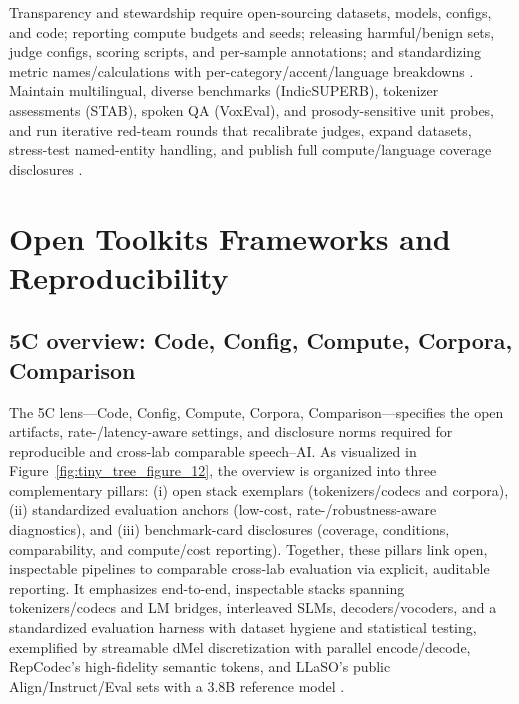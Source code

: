 \documentclass{article}
\begin{document}
Transparency and stewardship require open-sourcing datasets, models, configs, and code; reporting compute budgets and seeds; releasing harmful/benign sets, judge configs, scoring scripts, and per-sample annotations; and standardizing metric names/calculations with per-category/accent/language breakdowns \cite{peri2024speechguardexploringadversarialrobustnes}. Maintain multilingual, diverse benchmarks (IndicSUPERB), tokenizer assessments (STAB), spoken QA (VoxEval), and prosody-sensitive unit probes, and run iterative red-team rounds that recalibrate judges, expand datasets, stress-test named-entity handling, and publish full compute/language coverage disclosures \cite{entry2025indicsuperbspeechprocessinguniversalperf,vashishth2024stabspeechtokenizerassessmentbenchmark,cui2025voxevalbenchmarkingknowledgeunderstandin,onda2025benchmarkingprosodyencodingdiscretespeec,maimon2025salmonsuiteacousticlanguagemodelevaluati,sun2023contextualbiasingnamedentitieslargelangu,chen2023reducingbarriersselfsupervisedlearninghu}.

















\section{Open Toolkits Frameworks and Reproducibility} \label{sec:opentoolkitsframeworksandreproducibility}

\subsection{5C overview: Code, Config, Compute, Corpora, Comparison} \label{subsec:5coverview:code,config,compute,corpora,comparison}
The 5C lens---Code, Config, Compute, Corpora, Comparison---specifies the open artifacts, rate-/latency-aware settings, and disclosure norms required for reproducible and cross-lab comparable speech--AI. As visualized in Figure~\ref{fig:tiny_tree_figure_12}, the overview is organized into three complementary pillars: (i) open stack exemplars (tokenizers/codecs and corpora), (ii) standardized evaluation anchors (low-cost, rate-/robustness-aware diagnostics), and (iii) benchmark-card disclosures (coverage, conditions, comparability, and compute/cost reporting). Together, these pillars link open, inspectable pipelines to comparable cross-lab evaluation via explicit, auditable reporting. It emphasizes end-to-end, inspectable stacks spanning tokenizers/codecs and LM bridges, interleaved SLMs, decoders/vocoders, and a standardized evaluation harness with dataset hygiene and statistical testing, exemplified by streamable dMel discretization with parallel encode/decode, RepCodec's high-fidelity semantic tokens, and LLaSO's public Align/Instruct/Eval sets with a 3.8B reference model \cite{bai2025dmelspeechtokenizationmadesimple,huang2024repcodecspeechrepresentationcodectokeniz,sun2025llasofoundationalframeworkreproduciblere}. 
\end{document}
